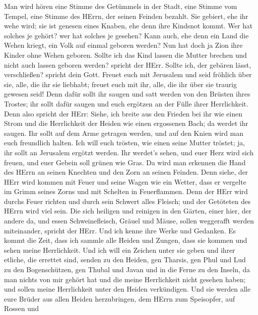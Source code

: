  Man wird hören eine Stimme des Getümmels in der Stadt, eine
Stimme vom Tempel, eine Stimme des HErrn, der seinen Feinden bezahlt.
 Sie gebiert, ehe ihr wehe wird; sie ist genesen eines
Knaben, ehe denn ihre Kindsnot kommt.  Wer hat solches je
gehört? wer hat solches je gesehen? Kann auch, ehe denn ein Land die
Wehen kriegt, ein Volk auf einmal geboren werden? Nun hat doch ja Zion
ihre Kinder ohne Wehen geboren.  Sollte ich das Kind lassen
die Mutter brechen und nicht auch lassen geboren werden? spricht der
HErr. Sollte ich, der gebären lässt, verschließen? spricht dein Gott.
 Freuet euch mit Jerusalem und seid fröhlich über sie,
alle, die ihr sie liebhabt; freuet euch mit ihr, alle, die ihr über sie
traurig gewesen seid!  Denn dafür sollt ihr saugen und satt
werden von den Brüsten ihres Trostes; ihr sollt dafür saugen und euch
ergötzen an der Fülle ihrer Herrlichkeit.  Denn also
spricht der HErr: Siehe, ich breite aus den Frieden bei ihr wie einen
Strom und die Herrlichkeit der Heiden wie einen ergossenen Bach; da
werdet ihr saugen. Ihr sollt auf dem Arme getragen werden, und auf den
Knien wird man euch freundlich halten.  Ich will euch
trösten, wie einen seine Mutter tröstet; ja, ihr sollt an Jerusalem
ergötzt werden.  Ihr werdet's sehen, und euer Herz wird
sich freuen, und euer Gebein soll grünen wie Gras. Da wird man erkennen
die Hand des HErrn an seinen Knechten und den Zorn an seinen Feinden.
 Denn siehe, der HErr wird kommen mit Feuer und seine Wagen
wie ein Wetter, dass er vergelte im Grimm seines Zorns und mit Schelten
in Feuerflammen.  Denn der HErr wird durchs Feuer richten
und durch sein Schwert alles Fleisch; und der Getöteten des HErrn wird
viel sein.  Die sich heiligen und reinigen in den Gärten,
einer hier, der andere da, und essen Schweinefleisch, Gräuel und Mäuse,
sollen weggerafft werden miteinander, spricht der HErr. 
Und ich kenne ihre Werke und Gedanken. Es kommt die Zeit, dass ich
sammle alle Heiden und Zungen, dass sie kommen und sehen meine
Herrlichkeit.  Und ich will ein Zeichen unter sie geben und
ihrer etliche, die errettet sind, senden zu den Heiden, gen Tharsis, gen
Phul und Lud zu den Bogenschützen, gen Thubal und Javan und in die Ferne
zu den Inseln, da man nichts von mir gehört hat und die meine
Herrlichkeit nicht gesehen haben; und sollen meine Herrlichkeit unter
den Heiden verkündigen.  Und sie werden alle eure Brüder
aus allen Heiden herzubringen, dem HErrn zum Speisopfer, auf Rossen und
